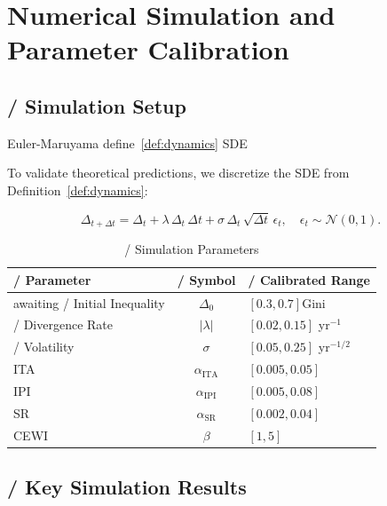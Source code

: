 \documentclass[11pt,a4paper]{article}
\theoremstyle{remark}
\newcommand{\ineq}{\Delta}
\newcommand{\lambdaparam}{\lambda}
\begin{document}
\section{Numerical Simulation and Parameter Calibration}

\subsection{ / Simulation Setup}

 Euler-Maruyama define~\ref{def:dynamics}  SDE

To validate theoretical predictions, we discretize the SDE from Definition~\ref{def:dynamics}:

\[
\ineq_{t+\Delta t} = \ineq_t + \lambdaparam \, \ineq_t \, \Delta t + 
                     \sigma \, \ineq_t \, \sqrt{\Delta t} \, \epsilon_t,
\quad \epsilon_t \sim \mathcal{N}(0,1).
\]



\begin{table}[htbp]
\centering
\caption{ / Simulation Parameters}
\label{tab:sim_params}
\begin{tabular}{@{}lcl@{}}
\toprule
\textbf{ / Parameter} & \textbf{ / Symbol} & \textbf{ / Calibrated Range} \\
\midrule
awaiting / Initial Inequality & $\ineq_0$ & $[0.3, 0.7]$Gini \\
 / Divergence Rate & $|\lambdaparam|$ & $[0.02, 0.15]$ yr$^{-1}$ \\
 / Volatility & $\sigma$ & $[0.05, 0.25]$ yr$^{-1/2}$ \\
ITA  & $\alpha_{\text{ITA}}$ & $[0.005, 0.05]$ \\
IPI  & $\alpha_{\text{IPI}}$ & $[0.005, 0.08]$ \\
SR  & $\alpha_{\text{SR}}$ & $[0.002, 0.04]$ \\
CEWI  & $\beta$ & $[1, 5]$ \\
\bottomrule
\end{tabular}
\end{table}

\subsection{ / Key Simulation Results}
\end{document}
